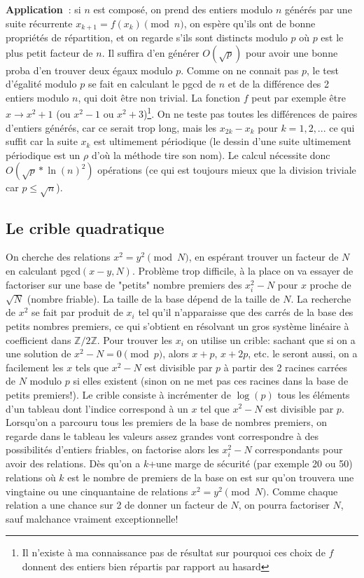 \documentclass[a4paper,11pt]{article}
\begin{document}
\begin{giacjshere}
{\bf Application~}: si $n$ est composé, on prend des entiers modulo $n$
générés par une suite 
récurrente $x_{k+1}=f(x_k) \pmod n$, 
on espère qu'ils ont de bonne propriétés de répartition, 
et on regarde s'ils sont distincts modulo $p$ où $p$ est 
le plus petit facteur de $n$. Il suffira d'en générer 
$O(\sqrt{p})$ pour avoir une bonne proba d'en trouver 
deux égaux modulo $p$. 
Comme on ne connait pas $p$, le test d'égalité modulo $p$ 
se fait en calculant le pgcd de $n$ et
de la différence des 2 entiers modulo $n$,
qui doit être non trivial. 
La fonction $f$ peut par exemple être $x \rightarrow x^2+1$ 
(ou $x^2-1$ ou $x^2+3$)\footnote{Il n'existe \`a ma connaissance
pas de résultat sur pourquoi ces choix de $f$ donnent 
des entiers bien répartis par rapport au hasard}. 
On ne teste pas toutes les différences de paires d'entiers générés,
car ce serait trop long,
mais les $x_{2k}-x_k$ pour $k=1,2,...$ 
ce qui suffit car la suite $x_k$ est ultimement périodique 
(le dessin d'une suite ultimement p\'eriodique est un $\rho$
d'o\`u la m\'ethode tire son nom). 
Le calcul nécessite donc $O(\sqrt{p}*\ln(n)^2)$ opérations 
(ce qui est toujours mieux que la division triviale car $p \leq \sqrt{n}$).

\subsection{Le crible quadratique}
On cherche des relations $x^2=y^2 \pmod N$, en espérant trouver un
facteur de $N$  en calculant pgcd$(x-y,N)$.
Problème trop difficile, à la place on va essayer de factoriser sur
une base de "petits" nombre premiers des $x_i^2-N$ pour $x$ 
proche de $\sqrt{N}$ (nombre friable). 
La taille de la base dépend de la taille de $N$. 
La recherche de $x^2$ se fait par produit de $x_i$ 
tel qu'il n'apparaisse que des carrés de la base des petits 
nombres premiers, ce qui s'obtient en résolvant 
un gros système linéaire à coefficient dans $\mathbb{Z}/2\mathbb{Z}$.
Pour trouver les $x_i$ on utilise un crible: 
sachant que si on a une solution de $x^2-N=0 \pmod p$, 
alors $x+p$, $x+2p$, etc. le seront aussi, on a facilement les $x$ 
tels que $x^2-N$ est divisible par $p$ à partir des 2 racines carrées 
de $N$ modulo $p$ si elles existent 
(sinon on ne met pas ces racines dans la base de petits premiers!). 
Le crible consiste à incrémenter de $\log(p)$ 
tous les éléments d'un tableau dont l'indice correspond 
à un $x$ tel que $x^2-N$ est divisible par $p$. 
Lorsqu'on a parcouru tous les premiers de la base de nombres premiers, 
on regarde dans le tableau les valeurs assez grandes 
vont correspondre à des possibilités d'entiers friables, 
on factorise alors les $x_i^2-N$ correspondants pour avoir des relations. 
Dès qu'on a $k$+une marge de sécurité (par exemple 20 ou 50) 
relations où $k$ est le nombre de premiers de la base 
on est sur qu'on trouvera une vingtaine ou une cinquantaine de
relations 
$x^2=y^2 \pmod N$. 
Comme chaque relation a une chance sur 2 de donner un facteur de $N$, 
on pourra factoriser $N$, sauf malchance vraiment exceptionnelle!


\end{giacjshere}
\end{document}
